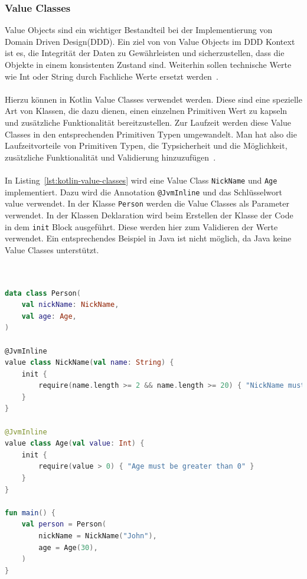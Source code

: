\documentclass[11pt]{article}
\begin{document}
    \subsubsection{Value Classes}
    Value Objects sind ein wichtiger Bestandteil bei der Implementierung von Domain Driven Design(DDD).
    Ein ziel von von Value Objects im DDD Kontext ist es, die Integrität der Daten zu Gewährleisten und sicherzustellen, dass die Objekte in einem konsistenten Zustand sind.
    Weiterhin sollen technische Werte wie Int oder String durch Fachliche Werte ersetzt werden~\cite[219]{red-book}.\\
    \\
    Hierzu können in Kotlin Value Classes verwendet werden.
    Diese sind eine spezielle Art von Klassen, die dazu dienen, einen einzelnen Primitiven Wert zu kapseln und zusätzliche Funktionalität bereitzustellen.
    Zur Laufzeit werden diese Value Classes in den entsprechenden Primitiven Typen umgewandelt.
    Man hat also die Laufzeitvorteile von Primitiven Typen, die Typsicherheit und die Möglichkeit, zusätzliche Funktionalität und Validierung hinzuzufügen~\cite{kotlin-value-classes}.\\
    \\
    In Listing~\ref{lst:kotlin-value-classes} wird eine Value Class \texttt{NickName} und \texttt{Age} implementiert.
    Dazu wird die Annotation \texttt{@JvmInline} und das Schlüsselwort value verwendet.
    In der Klasse \texttt{Person} werden die Value Classes als Parameter verwendet.
    In der Klassen Deklaration wird beim Erstellen der Klasse der Code in dem \texttt{init} Block ausgeführt.
    Diese werden hier zum Validieren der Werte verwendet.
    Ein entsprechendes Beispiel in Java ist nicht möglich, da Java keine Value Classes unterstützt.\\
    \\

    \begin{lstlisting}[language=Kotlin, caption={ValueClasses.kt}, label={lst:kotlin-value-classes}]

data class Person(
    val nickName: NickName,
    val age: Age,
)

@JvmInline
value class NickName(val name: String) {
    init {
        require(name.length >= 2 && name.length >= 20) { "NickName must be between 2 and 20 Letters" }
    }
}

@JvmInline
value class Age(val value: Int) {
    init {
        require(value > 0) { "Age must be greater than 0" }
    }
}

fun main() {
    val person = Person(
        nickName = NickName("John"),
        age = Age(30),
    )
}
    \end{lstlisting}
        
\end{document}
